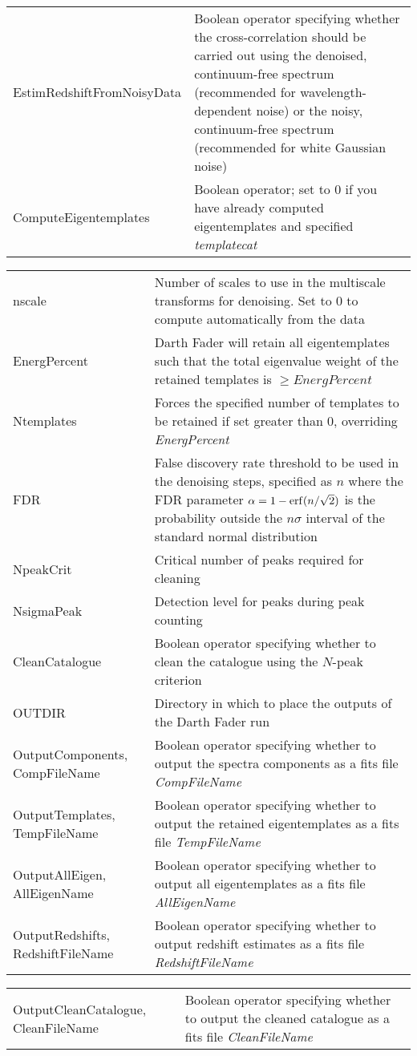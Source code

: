 \documentclass[a4paper]{article}
\begin{document}
\noindent\begin{tabularx}{\textwidth}{MI}
EstimRedshiftFromNoisyData & Boolean operator specifying whether the cross-correlation should be carried out using the denoised, continuum-free spectrum (recommended for wavelength-dependent noise) or the noisy, continuum-free spectrum (recommended for white Gaussian noise) \\
ComputeEigentemplates & Boolean operator; set to 0 if you have already computed eigentemplates and specified {\em templatecat} 
\end{tabularx}
\noindent\begin{tabularx}{\textwidth}{LI}
nscale & Number of scales to use in the multiscale transforms for denoising. Set to 0 to compute automatically from the data \\
EnergPercent & Darth Fader will retain all eigentemplates such that the total eigenvalue weight of the retained templates is $\ge EnergPercent$ \\
Ntemplates & Forces the specified number of templates to be retained if set greater than 0, overriding {\em EnergPercent} \\
FDR & False discovery rate threshold to be used in the denoising steps, specified as $n$ where the FDR parameter $\alpha = 1 - {\rm erf}(n/\sqrt{2})$ is the probability outside the $n\sigma$ interval of the standard normal distribution\\
NpeakCrit & Critical number of peaks required for cleaning \\
NsigmaPeak & Detection level for peaks during peak counting \\
CleanCatalogue & Boolean operator specifying whether to clean the catalogue using the $N$-peak criterion \\
OUTDIR & Directory in which to place the outputs of the Darth Fader run \\
OutputComponents, CompFileName & Boolean operator specifying whether to output the spectra components as a fits file {\em CompFileName} \\
OutputTemplates, TempFileName & Boolean operator specifying whether to output the retained eigentemplates as a fits file {\em TempFileName} \\
OutputAllEigen, AllEigenName & Boolean operator specifying whether to output all eigentemplates as a fits file {\em AllEigenName} \\
OutputRedshifts, $\ \ \ $RedshiftFileName & Boolean operator specifying whether to output redshift estimates as a fits file {\em RedshiftFileName} \\
\end{tabularx}
\noindent\begin{tabularx}{\textwidth}{LI}
OutputCleanCatalogue, CleanFileName & Boolean operator specifying whether to output the cleaned catalogue as a fits file {\em CleanFileName}
\end{tabularx}
\end{document}
